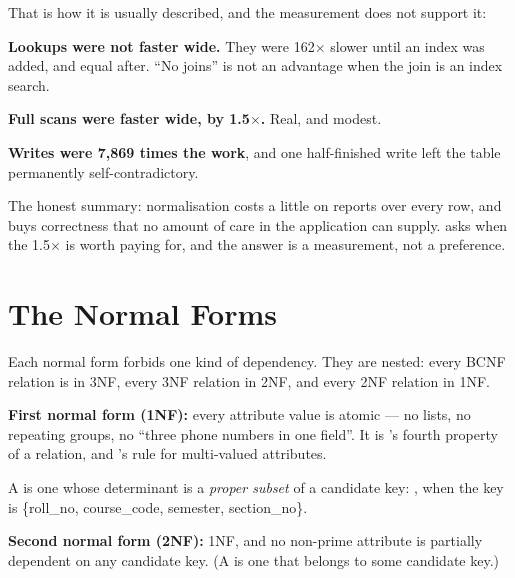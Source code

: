 \begin{alertbox}
That is how it is usually described, and the measurement does not support it:

\begin{tight}
  \item \textbf{Lookups were not faster wide.} They were 162$\times$ slower
        until an index was added, and equal after. ``No joins'' is not an
        advantage when the join is an index search.
  \item \textbf{Full scans were faster wide, by 1.5$\times$.} Real, and modest.
  \item \textbf{Writes were 7{,}869 times the work}, and one half-finished
        write left the table permanently self-contradictory.
\end{tight}

\smallskip
The honest summary: normalisation costs a little on reports over every row,
and buys correctness that no amount of care in the application can supply.
 asks when the 1.5$\times$ is worth paying for, and the
answer is a measurement, not a preference.
\end{alertbox}

\section{The Normal Forms}

Each normal form forbids one kind of dependency. They are nested: every BCNF
relation is in 3NF, every 3NF relation in 2NF, and every 2NF relation in 1NF.

\begin{definitionbox}[1NF and 2NF]
\textbf{First normal form (1NF):} every attribute value is atomic --- no
lists, no repeating groups, no ``three phone numbers in one field''. It is
's fourth property of a relation, and 's rule
for multi-valued attributes.

\smallskip
A  is one whose determinant is a \emph{proper subset}
of a candidate key: , when the key is \{roll\_no,
course\_code, semester, section\_no\}.

\smallskip
\textbf{Second normal form (2NF):} 1NF, and no non-prime attribute is partially
dependent on any candidate key. (A  is one that belongs
to some candidate key.)
\end{definitionbox}

